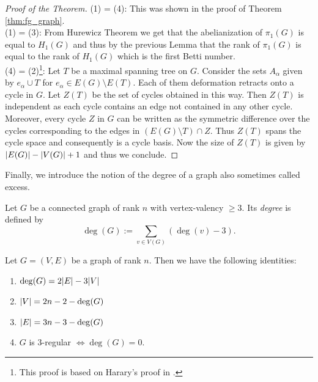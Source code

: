 \begin{proof}[Proof of the Theorem]
	(1) = (4): This was shown in the proof of Theorem \ref{thm:fg_graph}.\\
	(1) = (3): From Hurewicz Theorem we get that the abelianization of $\pi_{1}(G)$ is equal to $H_{1}(G)$
	and thus by the previous Lemma that the rank of $\pi_1(G)$ is equal to the rank of $H_1(G)$ which is the first Betti number.\\
	(4) = (2)\footnote{This proof is based on Harary's proof in \cite[p. 37-40]{harary69}.}:
	Let $T$ be a maximal spanning tree on $G$. Consider the sets $A_{\alpha}$ given by $e_{\alpha} \cup T$ for $e_{\alpha} \in E(G) \setminus E(T)$.
	Each of them deformation retracts onto a cycle in $G$. Let $Z(T)$ be the set of cycles obtained in this way. 
	Then  $Z(T)$ is independent as each cycle contains an edge not contained in any other cycle.
	Moreover, every cycle $Z$ in $G$ can be written as the symmetric difference over the cycles corresponding to the edges in $(E(G) \setminus T) \cap Z$.
	Thus $Z(T)$ spans the cycle space and consequently is a cycle basis. Now the size of $Z(T)$ is given by $\abs{E(G)} - \abs{V(G)} + 1$ and thus we conclude.
\end{proof}

Finally, we introduce the notion of the degree of a graph also sometimes called excess.
\begin{definition}
	Let $G$ be a connected graph of rank $n$ with vertex-valency $\geq 3$. Its \emph{degree} is defined by
	\[
		\deg(G) := \sum_{v \in V(G)} (\deg(v) - 3)
	.\] 
\end{definition}

\begin{proposition}
	Let $G = (V,E)$ be a graph of rank $n$. Then we have the following identities:
	\begin{enumerate}
		\item $\deg(G) = 2 \abs{E} - 3 \abs{V}$
		\item $\abs{V} = 2n -2 - \deg(G)$
		\item $\abs{E} = 3n - 3 - \deg(G)$
		\item $G$ is $3$-regular $\Leftrightarrow \deg(G) = 0$.
	\end{enumerate}	
\end{proposition}

